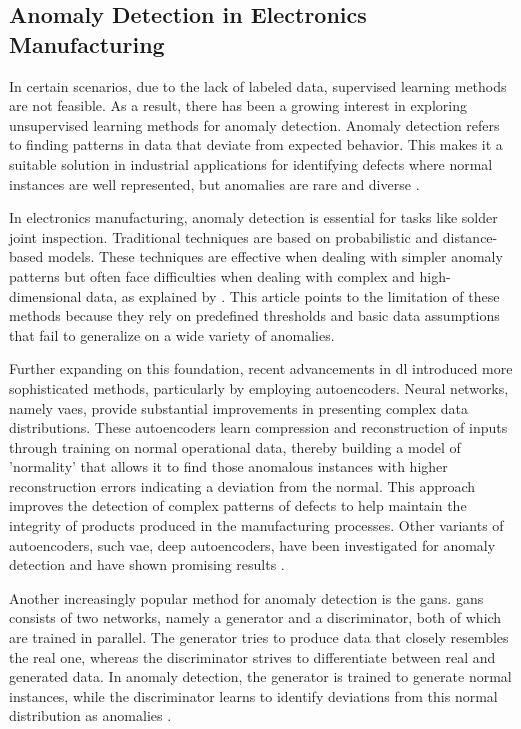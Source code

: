 \subsection{Anomaly Detection in Electronics Manufacturing}

In certain scenarios, due to the lack of labeled data, supervised learning methods are not feasible. As a result, there has been a growing interest in exploring unsupervised learning methods for anomaly detection. Anomaly detection refers to finding patterns in data that deviate from expected behavior. This makes it a suitable solution in industrial applications for identifying defects where normal instances are well represented, but anomalies are rare and diverse \cite{10.1145/1541880.1541882}.

In electronics manufacturing, anomaly detection is essential for tasks like solder joint inspection. Traditional techniques are based on probabilistic and distance-based models. These techniques are effective when dealing with simpler anomaly patterns but often face difficulties when dealing with complex and high-dimensional data, as explained by \cite{PIMENTEL2014215}. This article points to the limitation of these methods because they rely on predefined thresholds and basic data assumptions that fail to generalize on a wide variety of anomalies.

Further expanding on this foundation, recent advancements in \gls{dl} introduced more sophisticated methods, particularly by employing autoencoders\cite{bank2021autoencoders}. Neural networks, namely \glspl{vae}\cite{Kingma_2019}, provide substantial improvements in presenting complex data distributions. These autoencoders learn compression and reconstruction of inputs through training on normal operational data, thereby building a model of 'normality' that allows it to find those anomalous instances with higher reconstruction errors indicating a deviation from the normal\cite{bank2021autoencoders}. This approach improves the detection of complex patterns of defects to help maintain the integrity of products produced in the manufacturing processes. Other variants of autoencoders, such \gls{vae}, deep autoencoders, have been investigated for anomaly detection and have shown promising results \cite{Kingma_2019}.

Another increasingly popular method for anomaly detection is the \glspl{gan}\cite{goodfellow2014generativeadversarialnetworks}. \glspl{gan} consists of two networks, namely a generator and a discriminator, both of which are trained in parallel. The generator tries to produce data that closely resembles the real one, whereas the discriminator strives to differentiate between real and generated data. In anomaly detection, the generator is trained to generate normal instances, while the discriminator learns to identify deviations from this normal distribution as anomalies \cite{schlegl2017unsupervisedanomalydetectiongenerative}.

